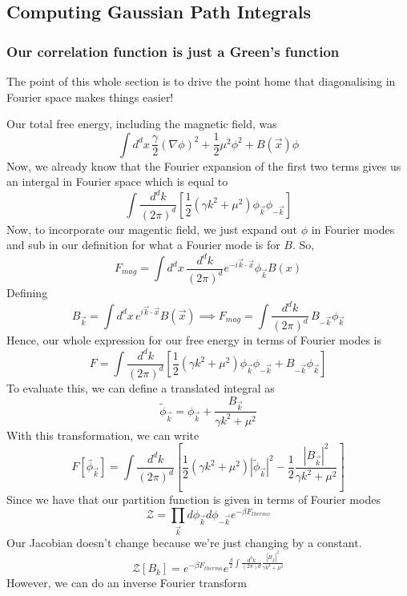 \subsection{Computing Gaussian Path Integrals}

\subsubsection{Our correlation function is just a Green's function} 
The point of this whole section is to drive the point home 
that diagonalising in Fourier space makes things easier!

Our total free energy, including the magnetic field, was
 \[
	 \int d^ d x \, \frac{\gamma}{2 } ( \nabla \phi ) ^ 2 + \frac{1}{2 }\mu^ 2 \phi ^ 2 + B ( \vec{x} ) \phi 
 \] Now, we already know that the Fourier expansion of the first two terms gives us an intergal in Fourier space which is equal to 
 \[
	 \int \frac{ d^ d k}{ ( 2 \pi ) ^ d } \left[  \frac{1}{2 } \left(  \gamma k^ 2 + \mu^ 2  \right) \phi_{ \vec{k} } \phi_{  - \vec{k} }   \right] 
 \] Now, to incorporate our magentic field, we just expand out $ \phi $ in Fourier modes 
 and sub in our definition for what a Fourier mode is for $ B $. 
 So, 
 \[
	 F_{ mag } = \int d^ d x \, \frac{ d^ d  k }{ ( 2 \pi ) ^ d } e^{  - i \vec{k} \cdot  \vec{x} } \phi_{ \vec{k}  } B ( x )
 \] Defining 
 \[
	 B_{ \vec{k}}  = \int d^d x \, e^{  i \vec{k} \cdot  \vec{x} } B ( \vec{x} ) \implies F_{ mag } = \int \frac{ d ^ d k }{ ( 2 \pi ) ^ d  } \, B_{ - \vec{k} } \phi_{ \vec{k}}
 \] Hence, our whole expression for our free energy in terms of 
 Fourier modes is 
 \[
	 F  = \int \frac{ d^ d k }{ ( 2 \pi ) ^ d } \left[  \frac{1}{2 }( \gamma k ^ 2 + \mu ^ 2 ) \phi_{\vec{k} } \phi_{  - \vec{k} } + B_{ - \vec{k} } \phi_{ \vec{k}} \right] 
 \] To evaluate this, we can define a translated integral as 
\[
 \tilde{\phi}_{\vec{k}} = \phi_{ \vec{k} } + \frac{B_{ \vec{k} }}{\gamma k ^  2+ \mu^ 2 } 
\] With this transformation, we can write 
\[
F [ \tilde{ \phi_{ \vec{k} } }] = \int \frac{ d^ d k }{ ( 2 \pi ) ^ d } \left[  \frac{1}{2 } ( \gamma k^ 2 + \mu ^ 2 ) | \tilde{\phi }_{ \vec{k}} |^ 2 - \frac{1}{2 } \frac{ | B_{ \vec{k} } | ^ 2  }{ \gamma k ^ 2 + \mu ^ 2 }  \right]   
\] Since we have that our partition function is given in terms of Fourier modes 
\[
 \mathcal{ Z } = \prod_{ \vec{k}} d \phi_{ \vec{k} } d\phi_{ - \vec{k} } e^{  - \beta F_{ thermo}}
\] Our Jacobian doesn't change because we're just changing by a constant. 
\[
	\mathcal{ Z } [ B_{ { k } } ] = e^{  - \beta F_{ thermo } }e^{ \frac{\beta}{2 } \int \frac{ d^ d k }{ ( 2 \pi ) d } \frac{ | B_{ \vec{k} } | ^ 2 }{\gamma k^ 2 + \mu ^ 2 }}
\] However, we can do an inverse Fourier transform 
